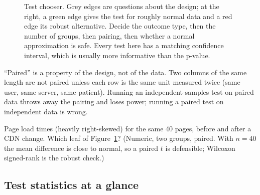 \begin{figure}[H]
\caption{Test chooser. Grey edges are questions about the design; at the right, a green edge gives the test for roughly normal data and a red edge its robust alternative. Decide the outcome type, then the number of groups, then pairing, then whether a normal approximation is safe. Every test here has a matching confidence interval, which is usually more informative than the p-value.}
\label{fig:appendix-formulas-test-chooser}
\end{figure}

\begin{trapbox}
``Paired'' is a property of the design, not of the data. Two columns of the same length are not paired unless each row is the same unit measured twice (same user, same server, same patient). Running an independent-samples test on paired data throws away the pairing and loses power; running a paired test on independent data is wrong.
\end{trapbox}

\begin{recoverybox}
Page load times (heavily right-skewed) for the same 40 pages, before and after a CDN change. Which leaf of Figure~\ref{fig:appendix-formulas-test-chooser}? (Numeric, two groups, paired. With $n=40$ the mean difference is close to normal, so a paired $t$ is defensible; Wilcoxon signed-rank is the robust check.)
\end{recoverybox}

\subsection{Test statistics at a glance}

